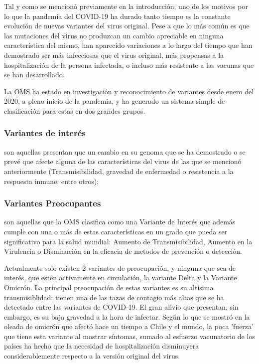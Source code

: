 Tal y como se mencionó previamente en la introducción, uno de los motivos por lo que la pandemia del COVID-19 ha durado tanto tiempo es la constante evolución de nuevas variantes del virus original. Pese a que lo más común es que las mutaciones del virus no produzcan un cambio apreciable en ninguna característica del mismo, han aparecido variaciones a lo largo del tiempo que han demostrado ser más infecciosas que el virus original, más propensas a la hospitalización de la persona infectada, o incluso más resistente a las vacunas que se han desarrollado.

La OMS ha estado en investigación y reconocimiento de variantes desde enero del 2020, a pleno inicio de la pandemia, y ha generado un sistema simple de clasificación para estas en dos grandes grupos. 

\subsubsection*{Variantes de interés} son aquellas presentan que un cambio en su genoma que se ha demostrado o se prevé que afecte alguna de las características del virus de las que se mencionó anteriormente (Transmisibilidad, gravedad de enfermedad o resistencia a la respuesta inmune, entre otros); 

\subsubsection*{Variantes Preocupantes} son aquellas que la OMS clasifica como una Variante de Interés que además cumple con una o más de estas características en un grado que pueda ser significativo para la salud mundial: Aumento de Transmisibilidad, Aumento en la Virulencia o Disminución en la eficacia de metodos de prevención o detección.\cite{oms}

Actualmente solo existen 2 variantes de preocupación, y ninguna que sea de interés, que estén activamente en circulación, la variante Delta y la Variante Omicrón. La principal preocupación de estas variantes es su altísima transmisiblidad: tienen una de las tazas de contagio más altas que se ha detectado entre las variantes de COVID-19. El gran alivio que presentan, sin embargo, es su baja gravedad a la hora de infectar. Según lo que se mostró en la oleada de omicrón que afectó hace un tiempo a Chile y el mundo, la poca 'fuerza' que tiene esta variante al mostrar síntomas, sumado al esfuerzo vacunatorio de los países ha hecho que la necesidad de hospitalización disminuyera considerablemente respecto a la versión original del virus.

